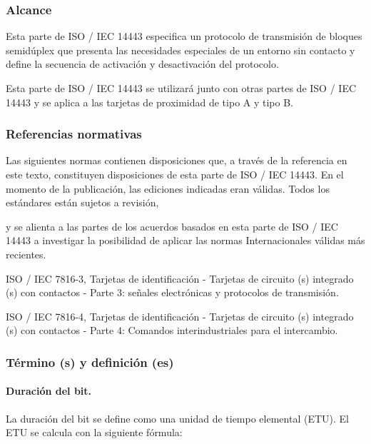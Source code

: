 \subsubsection{Alcance}
Esta parte de ISO / IEC 14443 especifica un protocolo de transmisión de bloques semidúplex que presenta las necesidades especiales de un entorno sin contacto y define la secuencia de activación y desactivación del protocolo.\par

Esta parte de ISO / IEC 14443 se utilizará junto con otras partes de ISO / IEC 14443 y se aplica a las tarjetas de proximidad de tipo A y tipo B.\par

\subsubsection{Referencias normativas}
Las siguientes normas contienen disposiciones que, a través de la referencia en este texto, constituyen disposiciones de esta parte de ISO / IEC 14443. En el momento de la publicación, las ediciones indicadas eran válidas. Todos los estándares están sujetos a revisión,\par

y se alienta a las partes de los acuerdos basados ​​en esta parte de ISO / IEC 14443 a investigar la posibilidad de aplicar las normas Internacionales válidas más recientes.\par

ISO / IEC 7816-3, Tarjetas de identificación - Tarjetas de circuito (s) integrado (s) con contactos - Parte 3: señales electrónicas y protocolos de transmisión.\par

ISO / IEC 7816-4, Tarjetas de identificación - Tarjetas de circuito (s) integrado (s) con contactos - Parte 4: Comandos interindustriales para el intercambio.\par

\subsubsection{Término (s) y definición (es)}
\paragraph{Duración del bit.}
La duración del bit se define como una unidad de tiempo elemental (ETU). El ETU se calcula con la siguiente fórmula:\par

